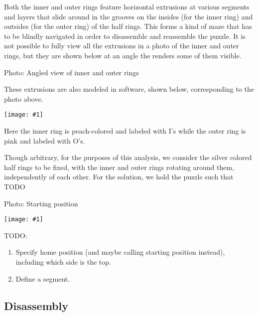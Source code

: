 \documentclass{article}
\newcommand{\diagram}[1]{
      \begin{center}
            \texttt{[image: \#1]}
      \end{center}
}
\newcommand{\photo}[1]{
      \begin{center}
            Photo: #1
      \end{center}
}
\begin{document}
Both the inner and outer rings feature horizontal extrusions at various segments and layers that slide around in the grooves on the insides (for the inner ring) and outsides (for the outer ring) of the half rings.
This forms a kind of maze that has to be blindly navigated in order to disassemble and reassemble the puzzle.
It is not possible to fully view all the extrusions in a photo of the inner and outer rings, but they are shown below at an angle the renders some of them visible.
\photo{Angled view of inner and outer rings}
These extrusions are also modeled in software, shown below, corresponding to the photo above.
\diagram{rings-00}
Here the inner ring is peach-colored and labeled with I's while the outer ring is pink and labeled with O's.

Though arbitrary, for the purposes of this analysis, we consider the silver colored half rings to be fixed, with the inner and outer rings rotating around them, independently of each other.
For the solution, we hold the puzzle such that TODO
\photo{Starting position}
\diagram{starting-00}

TODO:
\begin{enumerate}
      \item Specify home position (and maybe calling starting position instead), including which side is the top.
      \item Define a segment.
\end{enumerate}

\subsection{Disassembly}
\end{document}
